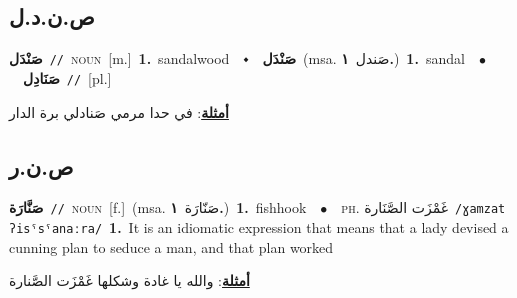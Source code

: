 \documentclass[10pt,a4paper,twoside]{article} %
\begin{document}
\begin{multicols}{2}
\vspace{-3mm}
\subsection*{\color{blue}\foreignlanguage{arabic}{ص.ن.د.ل}\color{blue}{}} 

{\setlength\topsep{0pt}\textbf{\foreignlanguage{arabic}{صَنْدَل}}\ {\color{gray}\texttt{//}\color{black}}\ \textsc{noun}\ [m.]\ \textbf{1.}~sandalwood\ \ $\smblkdiamond$\ \ \setlength\topsep{0pt}\textbf{\foreignlanguage{arabic}{صَنْدَل}}\ \color{gray}(msa. \foreignlanguage{arabic}{صَندل}~\foreignlanguage{arabic}{\textbf{١.}})\color{black}\ \textbf{1.}~sandal\ \ $\bullet$\ \ \setlength\topsep{0pt}\textbf{\foreignlanguage{arabic}{صَنَادِل}}\ {\color{gray}\texttt{//}\color{black}}\ [pl.]\  \begin{flushright}\color{gray}\foreignlanguage{arabic}{\textbf{\underline{\foreignlanguage{arabic}{أمثلة}}}: في حدا مرمي صَنادلي برة الدار}\end{flushright}\color{black}} \vspace{2mm}

\vspace{-3mm}
\subsection*{\color{blue}\foreignlanguage{arabic}{ص.ن.ر}\color{blue}{}} 

{\setlength\topsep{0pt}\textbf{\foreignlanguage{arabic}{صَنَّارَة}}\ {\color{gray}\texttt{//}\color{black}}\ \textsc{noun}\ [f.]\ \color{gray}(msa. \foreignlanguage{arabic}{صَنّارَة}~\foreignlanguage{arabic}{\textbf{١.}})\color{black}\ \textbf{1.}~fishhook\ \ $\bullet$\ \ \textsc{ph.} \color{gray} \foreignlanguage{arabic}{غَمْزَت الصَّنَارة}\color{black}\ {\color{gray}\texttt{/{\sffamily ɣamzat ʔisˤsˤanaːra}/}\color{black}}\ \textbf{1.}~It is an idiomatic expression that means that a lady devised a cunning plan to seduce a man, and that plan worked\  \begin{flushright}\color{gray}\foreignlanguage{arabic}{\textbf{\underline{\foreignlanguage{arabic}{أمثلة}}}: والله يا غادة وشكلها غَمْزَت الصَّنارة}\end{flushright}\color{black}} \vspace{2mm}


\end{multicols}
\end{document}
